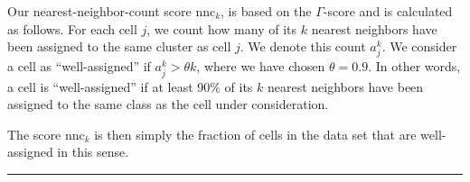 \documentclass[twocolumn,10pt]{article}
\begin{document}
Our nearest-neighbor-count score $\text{nnc}_k$, is based on the $\Gamma$-score \citep{Kireeva_2014} and is calculated as follows.
For each cell $j$, we count how many of its $k$ nearest neighbors have been assigned to the same cluster as cell $j$.
We denote this count $a^k_j$.
We consider a cell as ``well-assigned'' if $a^k_j>\theta k$, where we have chosen $\theta=0.9$.
In other words, a cell is ``well-assigned'' if at least 90\% of its $k$ nearest neighbors have been assigned to the same class as the cell under consideration.

The score $\text{nnc}_k$ is then simply the fraction of cells in the data set that are well-assigned in this sense.

\vspace{1.4ex}
\noindent\hfil\rule{.6\columnwidth}{.2pt}\hfil


{\small }
\end{document}
